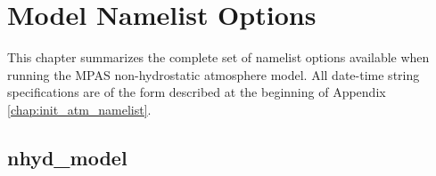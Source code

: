 
\chapter{Model Namelist Options}
\label{chap:atm_namelist}

This chapter summarizes the complete set of namelist options available when running the MPAS non-hydrostatic atmosphere model.
All date-time string specifications are of the form described at the beginning of Appendix \ref{chap:init_atm_namelist}.

\section{nhyd\_model}

